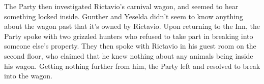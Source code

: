\documentclass[a4paper,11pt]{article}
\begin{document}
The Party then investigated Rictavio's carnival wagon, and seemed to hear something locked inside. Gunther and 
Yeselda didn't seem to know anything about the wagon past that it's owned by Rictavio. Upon returning to the Inn,
the Party spoke with two grizzled hunters who refused to take part in breaking into someone else's property. They
then spoke with Rictavio in his guest room on the second floor, who claimed that he knew nothing about any 
animals being inside his wagon. Getting nothing further from him, the Party left and resolved to break into the 
wagon.
\end{document}
